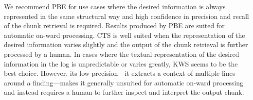 We recommend PBE for use cases where the desired information is always
represented in the same structural way and high confidence in
precision and recall of the chunk retrieval is required.
Results
produced by PBE are suited for automatic on-ward processing.
CTS is
well suited when the representation of the desired information varies
slightly and the output of the chunk retrieval is further processed by
a human.
In cases where the textual representation of the desired
information in the log is unpredictable or varies greatly, KWS seems
to be the best choice.
However, its low precision---it extracts a
context of multiple lines around a finding---makes it generally
unsuited for automatic on-ward processing and instead requires a human
to further inspect and interpret the output chunk.




